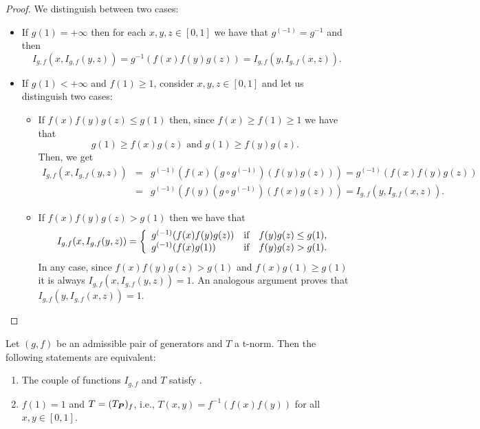 \begin{proof}
	We distinguish between two cases:
	\begin{itemize}
		\item If $g(1)=+\infty$ then for each $x,y,z \in [0,1]$ we have that $g^{(-1)}=g^{-1}$ and then
		$$I_{g,f}(x,I_{g,f}(y,z))=g^{-1}(f(x)f(y)g(z))=I_{g,f}(y,I_{g,f}(x,z)).$$
		\item If $g(1)< + \infty$ and $f(1)\geq 1$, consider $x,y,z \in [0,1]$ and let us distinguish two cases:
		\begin{itemize}
			\item If $f(x)f(y)g(z) \leq g(1)$ then, since $f(x) \geq f(1) \geq 1$ we have that
			$$g(1)\geq f(x)g(z) \text{ and } g(1) \geq f(y)g(z).$$
			Then, we get
			\begin{eqnarray*}
				I_{g,f}(x, I_{g,f}(y,z))&=&g^{(-1)}(f(x) (g \circ g^{(-1)})(f(y)g(z)))= g^{(-1)}(f(x)f(y)g(z))\\
				&=&g^{(-1)}(f(y)(g \circ g^{(-1)})(f(x)g(z)))=I_{g,f}(y,I_{g,f}(x,z)).
			\end{eqnarray*}
			\item If $f(x)f(y)g(z)> g(1)$ then we have that
			$$I_{g,f}(x, I_{g,f}(y,z))= \left\{ \begin{array}{lcc}
				g^{(-1)}(f(x)f(y)g(z)) &   \hbox{if}  & f(y)g(z) \leq g(1), \\
				g^{(-1)}(f(x)g(1)) &  \hbox{if} & f(y)g(z) > g(1). 
			\end{array}
			\right.$$
			In any case, since $f(x)f(y)g(z) > g(1)$ and $f(x)g(1) \geq g(1)$ it is always $I_{g,f}(x,I_{g,f}(y,z))=1$. An analogous argument proves that $I_{g,f}(y,I_{g,f}(x,z))=1$.
		\end{itemize}
	\end{itemize}
\end{proof}

\begin{proposition}\label{prop:(g,f)(LI)}
Let $(g,f)$ be an admissible pair of generators and $T$ a t-norm. Then the following statements are equivalent:
	
	\begin{enumerate}[label=(\roman*)]
		\item The couple of functions $I_{g,f}$ and $T$ satisfy \LI.
		\item $f(1)=1$ and $T=(T_{\bm{P}})_f$, i.e., $T(x,y)=f^{-1}(f(x)f(y))$ for all $x,y \in [0,1]$.
	\end{enumerate}
\end{proposition}

